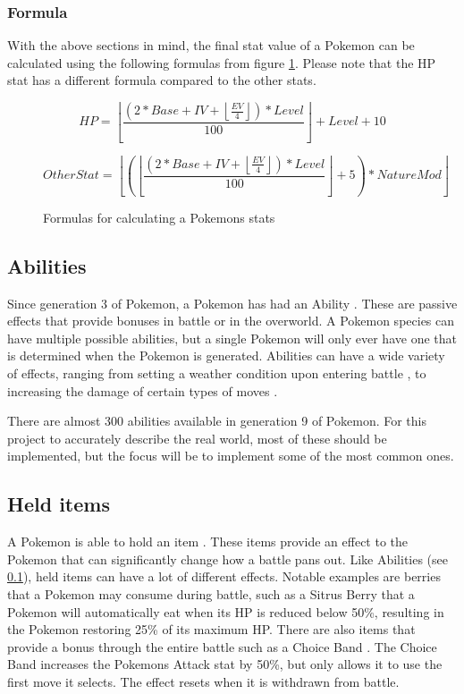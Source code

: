 \subsubsection{Formula}
With the above sections in mind, the final stat value of a Pokemon can be calculated using the following formulas from figure \ref{formula:stat-formula}.
Please note that the HP stat has a different formula compared to the other stats.

\begin{figure}[H]
  $$
    HP = \left\lfloor \frac{(2 * Base + IV + \left\lfloor \frac{EV}{4} \right\rfloor) * Level}{100} \right\rfloor + Level + 10
  $$
  
  $$
    OtherStat = \left\lfloor \left( \left\lfloor \frac{(2 * Base + IV + \left\lfloor \frac{EV}{4} \right\rfloor) * Level}{100} \right\rfloor + 5 \right) * NatureMod \right\rfloor
  $$
  \caption{Formulas for calculating a Pokemons stats \cite{PokemonStats}}
  \label{formula:stat-formula}
\end{figure}

\subsection{Abilities}
\label{subsec:abilities}
Since generation 3 of Pokemon, a Pokemon has had an Ability \cite{Abilities}. These are passive effects that provide bonuses in battle or in the overworld.
A Pokemon species can have multiple possible abilities, but a single Pokemon will only ever have one that is determined when the Pokemon is generated.
Abilities can have a wide variety of effects, ranging from setting a weather condition upon entering battle \cite{DrizzleAbility}, to increasing the damage of certain types of moves \cite{IronFistAbility}.

There are almost 300 abilities available in generation 9 of Pokemon. For this project to accurately describe the real world, most of these should be implemented, but the focus will be to implement some of the most common ones.

\subsection{Held items}
A Pokemon is able to hold an item \cite{HeldItems}. These items provide an effect to the Pokemon that can significantly change how a battle pans out. Like Abilities (see \ref{subsec:abilities}),
held items can have a lot of different effects. Notable examples are berries that a Pokemon may consume during battle, such as a Sitrus Berry \cite{SitrusBerry} that a Pokemon will automatically eat
when its HP is reduced below 50\%, resulting in the Pokemon restoring 25\% of its maximum HP. There are also items that provide a bonus through the entire battle such as a Choice Band \cite{ChoiceBand}.
The Choice Band increases the Pokemons Attack stat by 50\%, but only allows it to use the first move it selects. The effect resets when it is withdrawn from battle.

